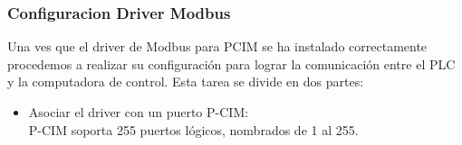 \subsubsection{Configuracion Driver Modbus}
Una ves que el driver de Modbus para PCIM se ha instalado correctamente procedemos a realizar su 
configuración para lograr la comunicación entre el PLC y la computadora de control. Esta tarea se
divide en dos partes: 
\begin{itemize}
 \item Asociar el driver con un puerto P-CIM:\\
 P-CIM soporta 255 puertos lógicos, nombrados de 1 al 255.


\end{itemize}
